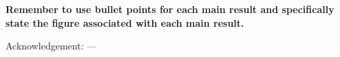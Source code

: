 \documentclass[linenumbers, twocolumn]{aastex631}
\begin{document}
\textbf{Remember to use bullet points for each main result and specifically state the figure associated with each main result.}

\begin{acknowledgments}
Acknowledgement: ---
\end{acknowledgments}

%

\vspace{5mm}



\end{document}
